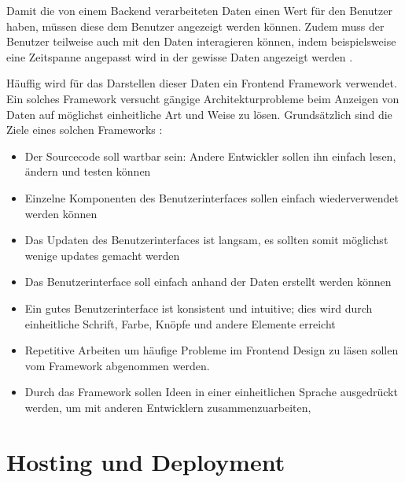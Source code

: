 Damit die von einem Backend verarbeiteten Daten einen Wert für den Benutzer haben, müssen diese
dem Benutzer angezeigt werden können. Zudem muss der Benutzer teilweise auch mit den
Daten interagieren können, indem beispielsweise eine Zeitspanne angepasst wird in
der gewisse Daten angezeigt werden \parencite{anokhina_2019}.

Häuffig wird für das Darstellen dieser Daten ein Frontend Framework verwendet.
Ein solches Framework versucht gängige Architekturprobleme beim Anzeigen von Daten auf möglichst einheitliche Art und Weise
zu lösen. Grundsätzlich sind die Ziele eines solchen Frameworks \parencite{do-i-need-a-frontend-fwk}:

\begin{itemize}
    \item Der Sourcecode soll wartbar sein: Andere Entwickler sollen ihn einfach lesen, ändern und testen können
    \item Einzelne Komponenten des Benutzerinterfaces sollen einfach wiederverwendet werden können
    \item Das Updaten des Benutzerinterfaces ist langsam, es sollten somit möglichst wenige updates gemacht werden
    \item Das Benutzerinterface soll einfach anhand der Daten erstellt werden können
    \item Ein gutes Benutzerinterface ist konsistent und intuitive; dies wird durch einheitliche Schrift, Farbe, Knöpfe und andere Elemente erreicht
    \item Repetitive Arbeiten um häufige Probleme im Frontend Design zu läsen sollen vom Framework abgenommen werden.
    \item Durch das Framework sollen Ideen in einer einheitlichen Sprache ausgedrückt werden, um mit anderen Entwicklern zusammenzuarbeiten,
\end{itemize}

%

\section{Hosting und Deployment}
\label{state:deployment}

